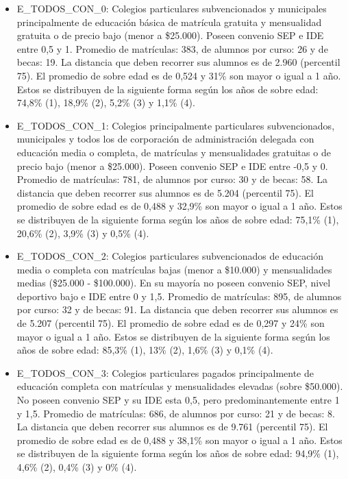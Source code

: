 \begin{itemize}
    \item E\_TODOS\_CON\_0: Colegios particulares subvencionados y municipales principalmente de educación básica de matrícula gratuita y mensualidad gratuita o de precio bajo (menor a \$25.000). Poseen convenio SEP e IDE entre 0,5 y 1. Promedio de matrículas: 383, de alumnos por curso: 26 y de becas: 19. La distancia que deben recorrer sus alumnos es de 2.960 (percentil 75). El promedio de sobre edad es de 0,524 y 31\% son mayor o igual a 1 año. Estos se distribuyen de la siguiente forma según los años de sobre edad: 74,8\% (1), 18,9\% (2), 5,2\% (3) y 1,1\% (4).
    \item E\_TODOS\_CON\_1: Colegios principalmente particulares subvencionados, municipales y todos los de corporación de administración delegada con educación media o completa, de matrículas y mensualidades gratuitas o de precio bajo (menor a \$25.000). Poseen convenio SEP e IDE entre -0,5 y 0. Promedio de matrículas: 781, de alumnos por curso: 30 y de becas: 58. La distancia que deben recorrer sus alumnos es de 5.204 (percentil 75). El promedio de sobre edad es de 0,488 y 32,9\% son mayor o igual a 1 año. Estos se distribuyen de la siguiente forma según los años de sobre edad: 75,1\% (1), 20,6\% (2), 3,9\% (3) y 0,5\% (4).
    \item E\_TODOS\_CON\_2: Colegios particulares subvencionados de educación media o completa con matrículas bajas (menor a \$10.000) y mensualidades medias (\$25.000 - \$100.000). En su mayoría no poseen convenio SEP, nivel deportivo bajo e IDE entre 0 y 1,5. Promedio de matrículas: 895, de alumnos por curso: 32 y de becas: 91. La distancia que deben recorrer sus alumnos es de 5.207 (percentil 75). El promedio de sobre edad es de 0,297 y 24\% son mayor o igual a 1 año. Estos se distribuyen de la siguiente forma según los años de sobre edad: 85,3\% (1), 13\% (2), 1,6\% (3) y 0,1\% (4).
    \item E\_TODOS\_CON\_3: Colegios particulares pagados principalmente de educación completa con matrículas y mensualidades elevadas (sobre \$50.000). No poseen convenio SEP y su IDE esta 0,5, pero predominantemente entre 1 y 1,5. Promedio de matrículas: 686, de alumnos por curso: 21 y de becas: 8. La distancia que deben recorrer sus alumnos es de 9.761 (percentil 75). El promedio de sobre edad es de 0,488 y 38,1\% son mayor o igual a 1 año. Estos se distribuyen de la siguiente forma según los años de sobre edad: 94,9\% (1), 4,6\% (2), 0,4\% (3) y 0\% (4).
\end{itemize}

